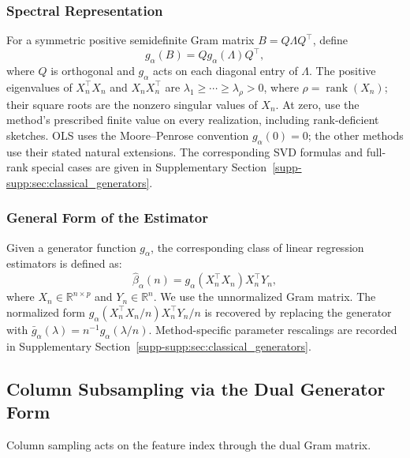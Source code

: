 \documentclass[pdflatex,iicol,sn-mathphys-ay]{sn-jnl}
\theoremstyle{thmstyleone}
\theoremstyle{thmstylethree}
\theoremstyle{thmstyletwo}
\newcommand{\RR}{\mathbb{R}}
\begin{document}
\subsubsection{Spectral Representation}
\label{subsubsec:spectral_representation}
For a symmetric positive semidefinite Gram matrix $B=Q\Lambda Q^\top$, define
\[
 g_\alpha(B)=Q g_\alpha(\Lambda)Q^\top,
\]
where $Q$ is orthogonal and $g_\alpha$ acts on each diagonal entry of
$\Lambda$. The positive eigenvalues of $X_n^\top X_n$ and $X_nX_n^\top$
are $\lambda_1\ge\cdots\ge\lambda_\rho>0$, where
$\rho=\operatorname{rank}(X_n)$; their square roots are the nonzero singular
values of $X_n$.
At zero, use the method's prescribed finite value on every realization,
including rank-deficient sketches. OLS uses the Moore--Penrose convention
$g_\alpha(0)=0$; the other methods use their stated natural extensions.
The corresponding SVD formulas and full-rank special cases are given in
Supplementary Section~\ref{supp-supp:sec:classical_generators}.

\subsubsection{General Form of the Estimator}
\label{subsubsec:estimator_form}

Given a generator function $g_\alpha$, the corresponding class of linear regression estimators is defined as:
\begin{equation*}
    \widehat{\beta}_{\alpha}(n)
    = g_{\alpha}\!\left(X_n^{\top} X_n\right) X_n^{\top} Y_n,
\end{equation*}
where $X_n\in\RR^{n\times p}$ and $Y_n\in\RR^n$. We use the
unnormalized Gram matrix. The normalized form
$g_\alpha(X_n^\top X_n/n)X_n^\top Y_n/n$ is recovered by replacing the
generator with $\bar g_\alpha(\lambda)=n^{-1}g_\alpha(\lambda/n)$.
Method-specific parameter rescalings are recorded in Supplementary
Section~\ref{supp-supp:sec:classical_generators}.

\subsection{Column Subsampling via the Dual Generator Form}
\label{subsec:column_subsampling_framework}

Column sampling acts on the feature index through the dual Gram matrix.
\end{document}
